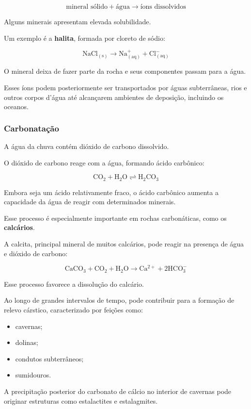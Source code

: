 \documentclass[a4paper,12pt]{article}
\theoremstyle{definition}
\theoremstyle{definition}
\theoremstyle{definition}
\begin{document}
\[
\text{mineral sólido} + \text{água}
\rightarrow
\text{íons dissolvidos}
\]

Alguns minerais apresentam elevada solubilidade.

Um exemplo é a \textbf{halita}, formada por cloreto de sódio:

\[
\mathrm{NaCl_{(s)}
\rightarrow
Na^+_{(aq)} + Cl^-_{(aq)}}
\]

O mineral deixa de fazer parte da rocha e seus componentes passam para a água.

Esses íons podem posteriormente ser transportados por águas subterrâneas, rios e outros corpos d'água até alcançarem ambientes de deposição, incluindo os oceanos.

\subsubsection{Carbonatação}

A água da chuva contém dióxido de carbono dissolvido.

O dióxido de carbono reage com a água, formando ácido carbônico:

\[
\mathrm{CO_2 + H_2O
\rightleftharpoons
H_2CO_3}
\]

Embora seja um ácido relativamente fraco, o ácido carbônico aumenta a capacidade da água de reagir com determinados minerais.

Esse processo é especialmente importante em rochas carbonáticas, como os \textbf{calcários}.

A calcita, principal mineral de muitos calcários, pode reagir na presença de água e dióxido de carbono:

\[
\mathrm{CaCO_3 + CO_2 + H_2O
\rightarrow
Ca^{2+} + 2HCO_3^-}
\]

Esse processo favorece a dissolução do calcário.

Ao longo de grandes intervalos de tempo, pode contribuir para a formação de relevo cárstico, caracterizado por feições como:

\begin{itemize}
    \item cavernas;
    \item dolinas;
    \item condutos subterrâneos;
    \item sumidouros.
\end{itemize}

A precipitação posterior do carbonato de cálcio no interior de cavernas pode originar estruturas como estalactites e estalagmites.
\end{document}
